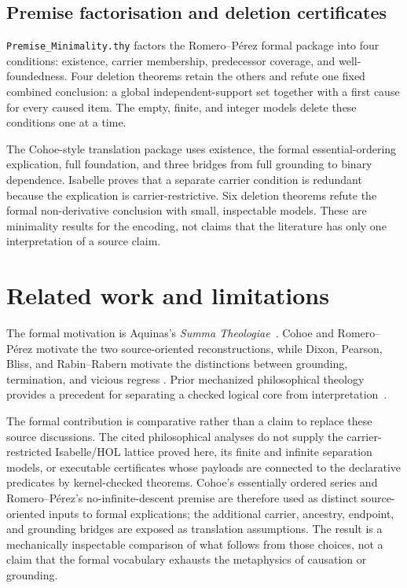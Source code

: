 \documentclass[11pt,a4paper]{article}
\begin{document}
\subsection{Premise factorisation and deletion certificates}

\texttt{Premise\_Minimality.thy} factors the Romero--Pérez formal package into
four conditions: existence, carrier membership, predecessor coverage, and
well-foundedness.  Four deletion theorems retain the others and refute one
fixed combined conclusion: a global independent-support set together with a
first cause for every caused item.  The empty, finite, and integer models
delete these conditions one at a time.

The Cohoe-style translation package uses existence, the formal
essential-ordering explication, full foundation, and three bridges from full
grounding to binary dependence.  Isabelle proves that a separate carrier
condition is redundant because the explication is carrier-restrictive.  Six
deletion theorems refute the formal non-derivative conclusion with small,
inspectable models.  These are minimality results for the encoding, not claims
that the literature has only one interpretation of a source claim.

\section{Related work and limitations}

The formal motivation is Aquinas's \emph{Summa Theologiae}~\cite{AquinasST}.
Cohoe and Romero--Pérez motivate the two source-oriented reconstructions, while
Dixon, Pearson, Bliss, and Rabin--Rabern motivate the distinctions between
grounding, termination, and vicious regress
\cite{Cohoe2013,RomeroPerez2012,Dixon2016,Pearson2023,Bliss2014,RabinRabern2016}.
Prior mechanized philosophical theology provides a precedent for separating a
checked logical core from interpretation~\cite{BenzmuellerPaleo2013}.

The formal contribution is comparative rather than a claim to replace these
source discussions.  The cited philosophical analyses do not supply the
carrier-restricted Isabelle/HOL lattice proved here, its finite and infinite
separation models, or executable certificates whose payloads are connected to
the declarative predicates by kernel-checked theorems.  Cohoe's essentially
ordered series and Romero--Pérez's no-infinite-descent premise are therefore
used as distinct source-oriented inputs to formal explications; the additional
carrier, ancestry, endpoint, and grounding bridges are exposed as translation
assumptions.  The result is a mechanically inspectable comparison of what
follows from those choices, not a claim that the formal vocabulary exhausts
the metaphysics of causation or grounding.
\end{document}
